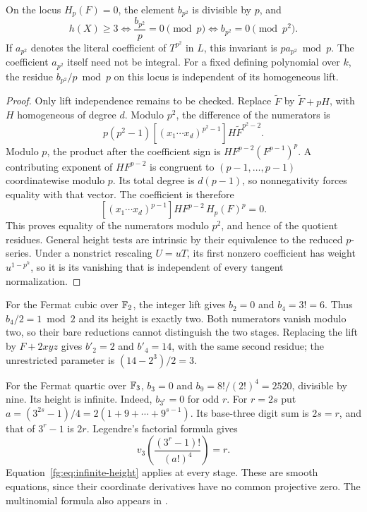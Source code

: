 \begin{corollary}\label{fg:cor:second}
On the locus $H_p(F)=0$, the element $b_{p^2}$ is divisible by $p$, and
\[
 h(X)\ge3\iff\frac{b_{p^2}}p=0\pmod p
            \iff b_{p^2}=0\pmod{p^2}.
\]
If $a_{p^2}$ denotes the literal coefficient of $T^{p^2}$ in $L$, this
invariant is $p a_{p^2}\bmod p$. The coefficient $a_{p^2}$ itself need
not be integral. For a fixed defining polynomial over $k$, the residue
$b_{p^2}/p\bmod p$ on this locus is independent of its homogeneous lift.
\end{corollary}

\begin{proof}
Only lift independence remains to be checked. Replace
$\widetilde F$ by $\widetilde F+pH$, with $H$ homogeneous of degree $d$.
Modulo $p^2$, the difference of the numerators is
\[
 p(p^2-1)[(x_1\cdots x_d)^{p^2-1}]H\widetilde F^{p^2-2}.
\]
Modulo $p$, the product after the coefficient sign is
$H F^{p-2}(F^{p-1})^p$. A contributing exponent of $HF^{p-2}$ is
congruent to $(p-1,\ldots,p-1)$ coordinatewise modulo $p$.
Its total degree is $d(p-1)$, so nonnegativity forces equality with
that vector. The coefficient is therefore
\[
 [(x_1\cdots x_d)^{p-1}]HF^{p-2}\, H_p(F)^p=0.
\]
This proves equality of the numerators modulo $p^2$, and hence of the
quotient residues. General height tests are intrinsic by their
equivalence to the reduced $p$-series. Under a nonstrict rescaling
$U=uT$, its first nonzero coefficient has weight $u^{1-p^h}$, so it is
its vanishing that is independent of every tangent normalization.
\end{proof}

\begin{example}\label{fg:ex:fermat}
For the Fermat cubic over $\mathbb F_2$, the integer lift gives $b_2=0$ and
$b_4=3!=6$. Thus $b_4/2=1\bmod2$ and its height is exactly two.
Both numerators vanish modulo two, so their bare reductions cannot
distinguish the two stages. Replacing the lift by $F+2xyz$ gives
$b'_2=2$ and $b'_4=14$, with the same second residue; the unrestricted
parameter is $(14-2^3)/2=3$.

For the Fermat quartic over $\mathbb F_3$, $b_3=0$ and
$b_9=8!/(2!)^4=2520$, divisible by nine. Its height is infinite.
Indeed, $b_{3^r}=0$ for odd $r$. For $r=2s$ put
$a=(3^{2s}-1)/4=2(1+9+\cdots+9^{s-1})$. Its base-three digit sum is
$2s=r$, and that of $3^r-1$ is $2r$. Legendre's factorial formula gives
\[
 v_3\left(\frac{(3^r-1)!}{(a!)^4}\right)=r.
\]
Equation~\eqref{fg:eq:infinite-height} applies at every stage.
These are smooth equations, since their coordinate derivatives have
no common projective zero. The multinomial formula also appears in
\citet[Example~4.13, p.~919]{fg-stienstra}.
\end{example}
